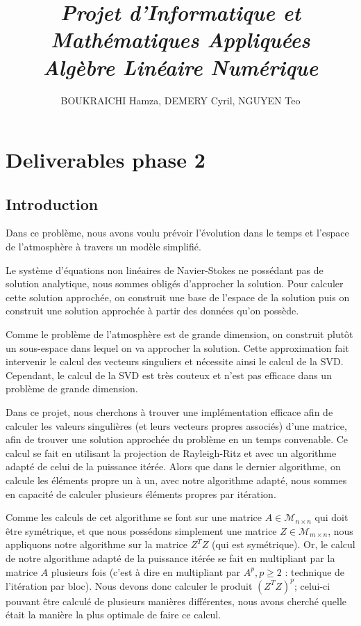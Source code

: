\documentclass[fleqn]{article}
\title{\textit {Projet d'Informatique et Mathématiques Appliquées \\
Algèbre Linéaire Numérique}}
\date{}
\author{BOUKRAICHI Hamza,
DEMERY Cyril,
NGUYEN Teo}
\begin{document}
\maketitle

\section{Deliverables phase 2}

\subsection{Introduction}

Dans ce problème, nous avons voulu prévoir l'évolution dans le temps et l'espace de l'atmosphère à travers un modèle simplifié.

Le système d'équations non linéaires de Navier-Stokes ne possédant pas de solution analytique, nous sommes obligés d'approcher la solution. Pour calculer cette solution approchée, on construit une base de l'espace de la solution puis on construit une solution approchée à partir des données qu'on possède.

Comme le problème de l'atmosphère est de grande dimension, on construit plutôt un sous-espace dans lequel on va approcher la solution.
Cette approximation fait intervenir le calcul des vecteurs singuliers et nécessite ainsi le calcul de la SVD. Cependant, le calcul de la SVD est très couteux et n'est pas efficace dans un problème de grande dimension.

Dans ce projet, nous cherchons à trouver une implémentation efficace afin de calculer les valeurs singulières (et leurs vecteurs propres associés) d'une matrice, afin de trouver une solution approchée du problème en un temps convenable. Ce calcul se fait en utilisant la projection de Rayleigh-Ritz et avec un algorithme adapté de celui de la puissance itérée. Alors que dans le dernier algorithme, on calcule les éléments propre un à un, avec notre algorithme adapté, nous sommes en capacité de calculer plusieurs éléments propres par itération.

Comme les calculs de cet algorithme se font sur une matrice $A \in \mathcal M _{n\times n}$ qui doit être symétrique, et que nous possédons simplement une matrice $Z \in \mathcal M _{m \times n}$, nous appliquons notre algorithme sur la matrice $Z^TZ$ (qui est symétrique). Or, le calcul de notre algorithme adapté de la puissance itérée se fait en multipliant par la matrice $A$ plusieurs fois (c'est à dire en multipliant par $A^p , p\geq 2$ : technique de l'itération par bloc). Nous devons donc calculer le produit $(Z^TZ)^p$; celui-ci pouvant être calculé de plusieurs manières différentes, nous avons cherché quelle était la manière la plus optimale de faire ce calcul.
\end{document}
